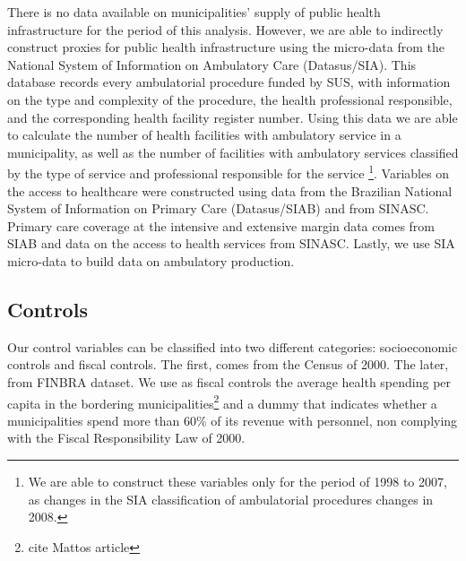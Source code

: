 There is no data available on municipalities' supply of public health infrastructure for the period of this analysis. However, we are able to indirectly construct proxies for public health infrastructure using the micro-data from the National System of Information on Ambulatory Care (Datasus/SIA). This database records every ambulatorial procedure funded by SUS, with information on the type and complexity of the procedure, the health professional responsible, and the corresponding health facility register number. Using this data we are able to calculate the number of health facilities with ambulatory service in a municipality, as well as the number of facilities with ambulatory services classified by the type of service and professional responsible for the service \footnote{We are able to construct these variables only for the period of 1998 to 2007, as changes in the SIA classification of ambulatorial procedures changes in 2008.}. Variables on the access to healthcare were constructed using data from the Brazilian National System of Information on Primary Care (Datasus/SIAB) and from SINASC. Primary care coverage at the intensive and extensive margin data comes from SIAB and data on the access to health services from SINASC. Lastly, we use SIA micro-data to build data on ambulatory production.

\subsection{Controls}

Our control variables can be classified into two different categories: socioeconomic controls and fiscal controls. The first, comes from the Census of 2000. The later, from FINBRA dataset. We use as fiscal controls the average health spending per capita in the bordering municipalities\footnote{cite Mattos article} and a dummy that indicates whether a municipalities spend more than 60\% of its revenue with personnel, non complying with the Fiscal Responsibility Law of 2000.

